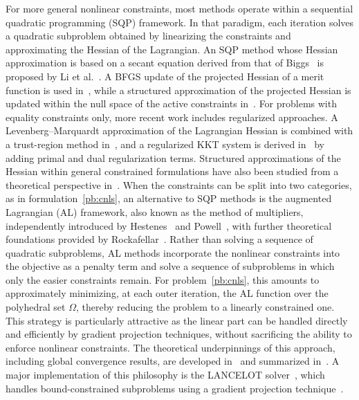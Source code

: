 \documentclass{article}
\numberwithin{equation}{section}
\theoremstyle{plain}
\begin{document}
	
	For more general nonlinear constraints, most methods operate within a sequential quadratic programming (SQP) framework. In that paradigm, each iteration solves a quadratic subproblem obtained by linearizing the constraints and approximating the Hessian of the Lagrangian. An SQP method whose Hessian approximation is based on a secant equation derived from that of Biggs~\cite{biggs:1977} is proposed by Li et al.~\cite{li-etal:2002}. A BFGS update of the projected Hessian of a merit function is used in~\cite{tjoabiegler:1991}, while a structured approximation of the projected Hessian is updated within the null space of the active constraints in~\cite{amiribartels:1989}.
	For problems with equality constraints only, more recent work includes regularized approaches. A Levenberg--Marquardt approximation of the Lagrangian Hessian is combined with a trust-region method in~\cite{bergou-etal:2021}, and a regularized KKT system is derived in~\cite{orbansiquiera:2020} by adding primal and dual regularization terms.
	Structured approximations of the Hessian within general constrained formulations have also been studied from a theoretical perspective in~\cite{tapia:1988}.
	When the constraints can be split into two categories, as in formulation~\eqref{pb:cnls}, an alternative to SQP methods is the augmented Lagrangian (AL) framework, also known as the method of multipliers, independently introduced by Hestenes~\cite{hestenes:1969} and Powell~\cite{powell:1969}, with further theoretical foundations provided by Rockafellar~\cite{rockafellar:1973}.
	Rather than solving a sequence of quadratic subproblems, AL methods incorporate the nonlinear constraints into the objective as a penalty term and solve a sequence of subproblems in which only the easier constraints remain.
	For problem~\eqref{pb:cnls}, this amounts to approximately minimizing, at each outer iteration, the AL function over the polyhedral set $\Omega$, thereby reducing the problem to a linearly constrained one. This strategy is particularly attractive as the linear part can be handled directly and efficiently by gradient projection techniques, without sacrificing the ability to enforce nonlinear constraints.
	The theoretical underpinnings of this approach, including global convergence results, are developed in~\cite{conn-etal:1988a,conn-etal:1991, conn-etal:1993, conn-etal:1996b} and summarized in~\cite[Chapter~14]{conn-etal:2000}.
	A major implementation of this philosophy is the LANCELOT solver~\cite{conn-etal:1992}, which handles bound-constrained subproblems using a gradient projection technique~\cite{conn-etal:1988b}.
\end{document}
